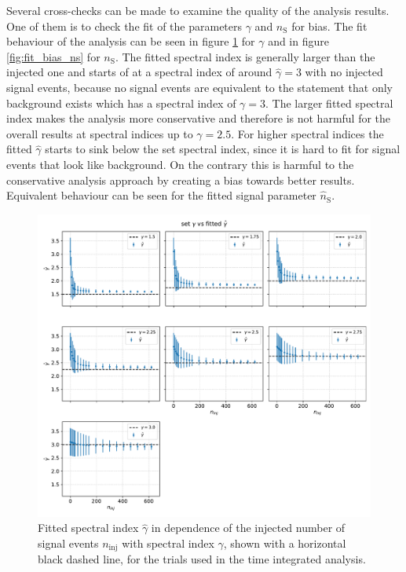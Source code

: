 Several cross-checks can be made to examine the quality of the analysis results.
One of them is to check the fit of the parameters $\gamma$ and $n_\text{S}$ for bias.
The fit behaviour of the analysis can be seen in figure \ref{fig:fit_bias_gamma} for $\gamma$ and in figure \ref{fig:fit_bias_ns} for $n_\text{S}$.
The fitted spectral index is generally larger than the injected one and starts of at a spectral index of around $\hat\gamma = \num{3}$ with no injected signal events, because no signal events are equivalent to the statement that only background exists which has a spectral index of $\gamma = \num{3}$.
The larger fitted spectral index makes the analysis more conservative and therefore is not harmful for the overall results at spectral indices up to $\gamma = \num{2.5}$.
For higher spectral indices the fitted $\hat\gamma$ starts to sink below the set spectral index, since it is hard to fit for signal events that look like background.
On the contrary this is harmful to the conservative analysis approach by creating a bias towards better results.
Equivalent behaviour can be seen for the fitted signal parameter $\hat{n}_\text{S}$.
\begin{figure}
    \centering
    \includegraphics[width=\linewidth]{Plots/05_csky/gamma_fit_auto_3.pdf}
    \caption{Fitted spectral index $\hat\gamma$ in dependence of the injected number of signal events $n_\text{inj}$ with spectral index $\gamma$, shown with a horizontal black dashed line, for the trials used in the time integrated analysis.}
    \label{fig:fit_bias_gamma}
\end{figure}


